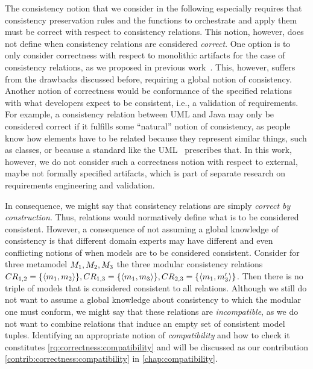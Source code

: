 The consistency notion that we consider in the following especially requires that consistency preservation rules and the functions to orchestrate and apply them must be correct with respect to consistency relations.
This notion, however, does not define when consistency relations are considered \emph{correct}.
One option is to only consider correctness with respect to monolithic artifacts for the case of consistency relations, as we proposed in previous work~\cite{klare2019icmt}.
This, however, suffers from the drawbacks discussed before, requiring a global notion of consistency.
Another notion of correctness would be conformance of the specified relations with what developers expect to be consistent, i.e., a validation of requirements.
For example, a consistency relation between UML and Java may only be considered correct if it fulfills some \enquote{natural} notion of consistency, as people know how elements have to be related because they represent similar things, such as classes, or because a standard like the \gls{UML}~\cite{uml} prescribes that.
In this work, however, we do not consider such a correctness notion with respect to external, maybe not formally specified artifacts, which is part of separate research on requirements engineering and validation.

In consequence, we might say that consistency relations are simply \emph{correct by construction}.
Thus, relations would normatively define what is to be considered consistent.
However, a consequence of not assuming a global knowledge of consistency is that different domain experts may have different and even conflicting notions of when models are to be considered consistent.
Consider for three metamodel $M_{1}, M_{2}, M_{3}$ the three modular consistency relations $CR_{1,2} = \{ \langle m_{1},m_{2} \rangle \}, CR_{1,3} = \{ \langle m_{1},m_{3} \rangle \}, CR_{2,3} = \{ \langle m_{1},m'_{3} \rangle \}$. 
Then there is no triple of models that is considered consistent to all relations. 
Although we still do not want to assume a global knowledge about consistency to which the modular one must conform, we might say that these relations are \emph{incompatible}, as we do not want to combine relations that induce an empty set of consistent model tuples.
Identifying an appropriate notion of \emph{compatibility} and how to check it constitutes \autoref{rq:correctness:compatibility} and will be discussed as our contribution \autoref{contrib:correctness:compatibility} in \autoref{chap:compatibility}.


